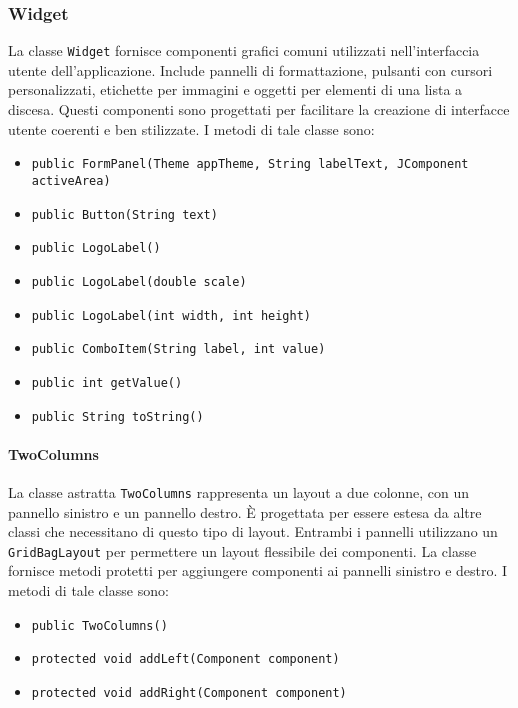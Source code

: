\subsubsection {Widget}
La classe \texttt{Widget} fornisce componenti grafici comuni utilizzati nell'interfaccia utente dell'applicazione.
Include pannelli di formattazione, pulsanti con cursori personalizzati, etichette per immagini e oggetti per elementi di una lista a discesa. 
Questi componenti sono progettati per facilitare la creazione di interfacce utente coerenti e ben stilizzate.
I metodi di tale classe sono:
\begin{itemize}
    \item \texttt{public FormPanel(Theme appTheme, String labelText, JComponent activeArea)}
    \item \texttt{public Button(String text)}
    \item \texttt{public LogoLabel()}
    \item \texttt{public LogoLabel(double scale)}
    \item \texttt{public LogoLabel(int width, int height)}
    \item \texttt{public ComboItem(String label, int value)}
    \item \texttt{public int getValue()}
    \item \texttt{public String toString()}
\end{itemize}

\paragraph{TwoColumns}
La classe astratta \texttt{TwoColumns} rappresenta un layout a due colonne, con un pannello sinistro e un pannello destro. È progettata per essere estesa da altre classi che necessitano di questo tipo di layout.
Entrambi i pannelli utilizzano un \texttt{GridBagLayout} per permettere un layout flessibile dei componenti.
La classe fornisce metodi protetti per aggiungere componenti ai pannelli sinistro e destro.
I metodi di tale classe sono:
\begin{itemize}
    \item \texttt{public TwoColumns()}
    \item \texttt{protected void addLeft(Component component)}
    \item \texttt{protected void addRight(Component component)}
\end{itemize}


